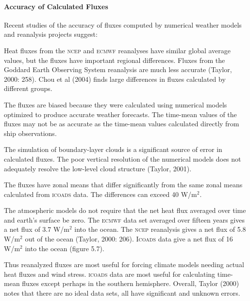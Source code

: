 \paragraph{Accuracy of Calculated Fluxes}
Recent studies of the accuracy of fluxes computed by
numerical weather models and reanalysis projects suggest:
\begin{enumerate}
\vitem
Heat fluxes from the \textsc{ncep} and \textsc{ecmwf} reanalyses have similar global average values, but the fluxes have important regional differences. Fluxes from the Goddard Earth Observing System reanalysis are much less accurate (Taylor, 2000: 258). Chou et al (2004) finds large differences in fluxes calculated by different groups.

\vitem
The fluxes are biased because they were calculated using numerical models
optimized to produce accurate weather forecasts. The time-mean values of the
fluxes may not be as accurate as the time-mean values calculated directly from
ship observations.

\vitem
The simulation of boundary-layer clouds is a significant source of error in calculated
fluxes. The poor vertical resolution of the numerical models does not adequately resolve the
low-level cloud structure (Taylor, 2001).

\vitem
The fluxes have zonal means that differ significantly from the same
zonal means calculated from \textsc{icoads} data. The differences can exceed 40
W/m$^2$.

\vitem
The atmospheric models do not require that the net heat flux averaged over
time and earth's surface be zero. The \textsc{ecmwf} data set averaged over fifteen
years gives a net flux of 3.7 W/m$^2$ into the ocean. The \textsc{ncep} reanalysis gives a net
flux of 5.8 W/m$^2$ out of the ocean (Taylor, 2000: 206). \textsc{Icoads} data give a net flux
of 16 W/m$^2$ into the ocean (figure 5.7).
\end{enumerate}
Thus reanalyzed fluxes are most useful for forcing climate models needing actual heat fluxes
and wind stress.
\textsc{icoads} data are most useful for calculating time-mean fluxes except
perhaps in the southern hemisphere. Overall, Taylor (2000) notes that there are no ideal data sets, all
have significant and unknown errors.

